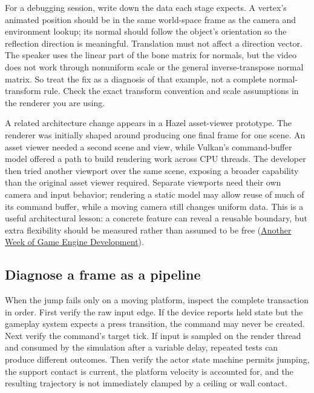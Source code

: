 For a debugging session, write down the data each stage expects. A vertex's animated position should be in the same world-space frame as the camera and environment lookup; its normal should follow the object's orientation so the reflection direction is meaningful. Translation must not affect a direction vector. The speaker uses the linear part of the bone matrix for normals, but the video does not work through nonuniform scale or the general inverse-transpose normal matrix. So treat the fix as a diagnosis of that example, not a complete normal-transform rule. Check the exact transform convention and scale assumptions in the renderer you are using.

A related architecture change appears in a Hazel asset-viewer prototype. The renderer was initially shaped around producing one final frame for one scene. An asset viewer needed a second scene and view, while Vulkan's command-buffer model offered a path to build rendering work across CPU threads. The developer then tried another viewport over the same scene, exposing a broader capability than the original asset viewer required. Separate viewports need their own camera and input behavior; rendering a static model may allow reuse of much of its command buffer, while a moving camera still changes uniform data. This is a useful architectural lesson: a concrete feature can reveal a reusable boundary, but extra flexibility should be measured rather than assumed to be free (\href{https://www.youtube.com/watch?v=Dr6ly-PO9nM&t=2m12s}{Another Week of Game Engine Development}).

\subsection{Diagnose a frame as a pipeline}\label{06-engine-ii-ch026-diagnose-a-frame-as-a-pipeline}

\hypertarget{06-engine-ii-ch026-diagnose-a-frame-as-a-pipeline}{}

When the jump fails only on a moving platform, inspect the complete transaction in order. First verify the raw input edge. If the device reports held state but the gameplay system expects a press transition, the command may never be created. Next verify the command's target tick. If input is sampled on the render thread and consumed by the simulation after a variable delay, repeated tests can produce different outcomes. Then verify the actor state machine permits jumping, the support contact is current, the platform velocity is accounted for, and the resulting trajectory is not immediately clamped by a ceiling or wall contact.

